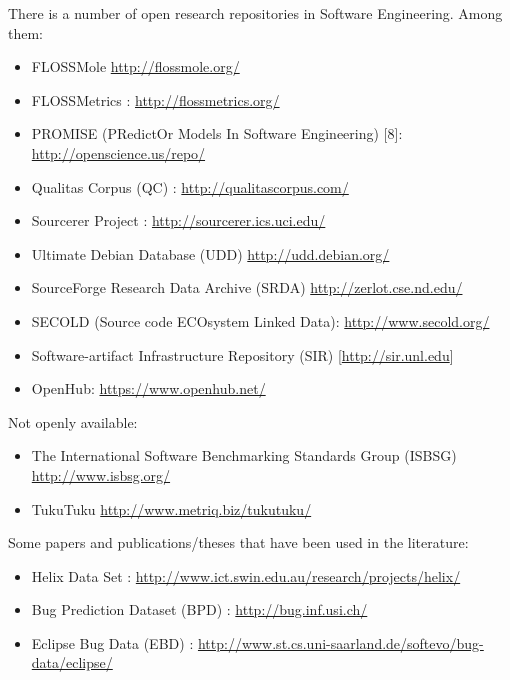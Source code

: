 \documentclass[]{book}
\begin{document}
There is a number of open research repositories in Software Engineering.
Among them:

\begin{itemize}
\item
  FLOSSMole \citep{HCC06} \url{http://flossmole.org/}
\item
  FLOSSMetrics \citep{herraiz2009flossmetrics}:
  \url{http://flossmetrics.org/}
\item
  PROMISE (PRedictOr Models In Software Engineering) {[}8{]}:
  \url{http://openscience.us/repo/}
\item
  Qualitas Corpus (QC) \citep{QualitasCorpus2010}:
  \url{http://qualitascorpus.com/}
\item
  Sourcerer Project \citep{LBNRB09}: \url{http://sourcerer.ics.uci.edu/}
\item
  Ultimate Debian Database (UDD) \citep{NZ10}
  \url{http://udd.debian.org/}
\item
  SourceForge Research Data Archive (SRDA) \citep{VanAntwerpM2008}
  \url{http://zerlot.cse.nd.edu/}
\item
  SECOLD (Source code ECOsystem Linked Data):
  \url{http://www.secold.org/}
\item
  Software-artifact Infrastructure Repository (SIR)
  {[}\url{http://sir.unl.edu}{]}
\item
  OpenHub: \url{https://www.openhub.net/}
\end{itemize}

Not openly available:

\begin{itemize}
\item
  The International Software Benchmarking Standards Group (ISBSG)
  \url{http://www.isbsg.org/}
\item
  TukuTuku \url{http://www.metriq.biz/tukutuku/}
\end{itemize}

Some papers and publications/theses that have been used in the
literature:

\begin{itemize}
\item
  Helix Data Set \citep{Vasa2010}:
  \url{http://www.ict.swin.edu.au/research/projects/helix/}
\item
  Bug Prediction Dataset (BPD) \citep[\citet{ALR11}]{DAmb2010a}:
  \url{http://bug.inf.usi.ch/}
\item
  Eclipse Bug Data (EBD) \citep[\citet{NZZH12}]{ZPZ07}:
  \url{http://www.st.cs.uni-saarland.de/softevo/bug-data/eclipse/}
\end{itemize}
\end{document}
